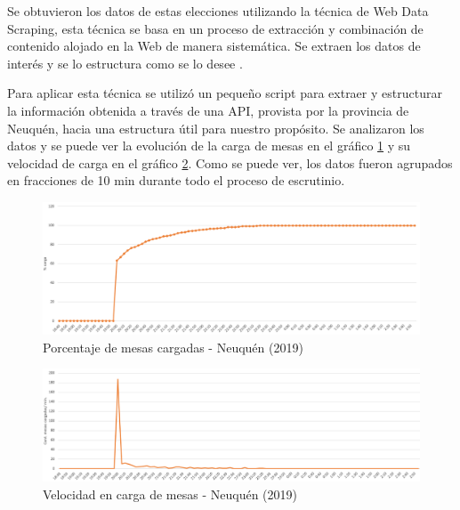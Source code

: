 Se obtuvieron los datos de estas elecciones utilizando la técnica de Web Data Scraping, esta técnica se basa en un proceso de extracción y combinación de contenido alojado en la Web de manera sistemática. Se extraen los datos de interés y se lo estructura como se lo desee \cite{glez2014web}.

Para aplicar esta técnica se utilizó un pequeño script para extraer y estructurar la información obtenida a través de una API, provista por la provincia de Neuquén, hacia una estructura útil para nuestro propósito. Se analizaron los datos y se puede ver la evolución de la carga de mesas en el gráfico \ref{graf:porcentajeNeuquen} y su velocidad de carga en el gráfico \ref{graf:velocidadNeuquen}. Como se puede ver, los datos fueron agrupados en fracciones de 10 min durante todo el proceso de escrutinio.

\begin{figure}[h!]
  \includegraphics[width=1\textwidth]{img/fOI0sHj9ac.png}
  \caption{Porcentaje de mesas cargadas - Neuquén (2019)}
  \label{graf:porcentajeNeuquen}
\end{figure}

\begin{figure}[h!]
  \includegraphics[width=1\textwidth]{img/QOsSnICbyL.png}
  \caption{Velocidad en carga de mesas - Neuquén (2019)}
  \label{graf:velocidadNeuquen}
\end{figure}


